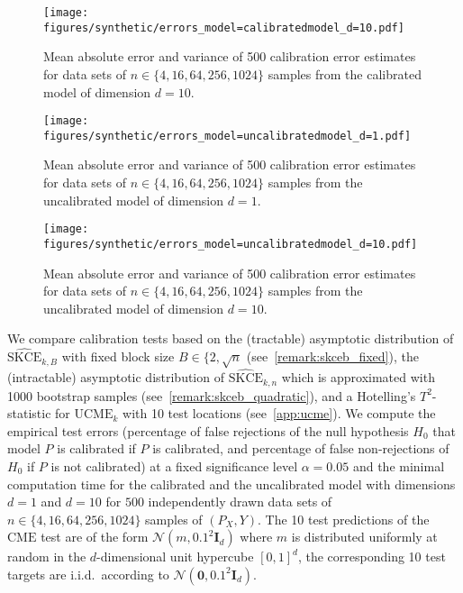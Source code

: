 \documentclass{article}
\begin{document}
\begin{figure}[hpt]
    \begin{center}
        \texttt{[image: figures/synthetic/errors\_model=calibratedmodel\_d=10.pdf]}
        \caption{Mean absolute error and variance of 500 calibration error estimates for
        data sets of $n \in \{4, 16, 64, 256, 1024\}$ samples from the calibrated model
        of dimension $d = 10$.}
        \label{fig:synthetic_error_calibrated_10}
    \end{center}
\end{figure}

\begin{figure}[hpt]
    \begin{center}
        \texttt{[image: figures/synthetic/errors\_model=uncalibratedmodel\_d=1.pdf]}
        \caption{Mean absolute error and variance of 500 calibration error estimates for
        data sets of $n \in \{4, 16, 64, 256, 1024\}$ samples from the uncalibrated model
        of dimension $d = 1$.}
        \label{fig:synthetic_error_uncalibrated_1}
    \end{center}
\end{figure}

\begin{figure}[hpt]
    \begin{center}
        \texttt{[image: figures/synthetic/errors\_model=uncalibratedmodel\_d=10.pdf]}
        \caption{Mean absolute error and variance of 500 calibration error estimates for
        data sets of $n \in \{4, 16, 64, 256, 1024\}$ samples from the uncalibrated model
        of dimension $d = 10$.}
        \label{fig:synthetic_error_uncalibrated_10}
    \end{center}
\end{figure}

We compare calibration tests based on the (tractable) asymptotic distribution of
$\widehat{\mathrm{SKCE}}_{k,B}$ with fixed block size $B \in \{2, \sqrt{n}$
(see~\cref{remark:skceb_fixed}), the (intractable) asymptotic distribution of
$\widehat{\mathrm{SKCE}}_{k,n}$ which is approximated with 1000 bootstrap
samples (see~\cref{remark:skceb_quadratic}), and a Hotelling's $T^2$-statistic for
$\mathrm{UCME}_k$ with 10 test locations (see~\cref{app:ucme}). We compute
the empirical test errors (percentage of false rejections of the null hypothesis $H_0$
that model $P$ is calibrated if $P$ is calibrated, and percentage of false non-rejections
of $H_0$ if $P$ is not calibrated) at a fixed significance level $\alpha = 0.05$ and
the minimal computation time for the calibrated and the uncalibrated model with
dimensions $d = 1$ and $d = 10$ for $500$ independently drawn data sets of
$n \in \{4, 16, 64, 256, 1024\}$ samples of $(P_X, Y)$. The 10 test
predictions of the $\mathrm{CME}$ test are of the form $\mathcal{N}(m, 0.1^2 \mathbf{I}_d)$
where $m$ is distributed uniformly at random in the $d$-dimensional unit hypercube $[0,1]^d$,
the corresponding 10 test targets are i.i.d.\ according to
$\mathcal{N}(\mathbf{0}, 0.1^2 \mathbf{I}_d)$.
\end{document}
